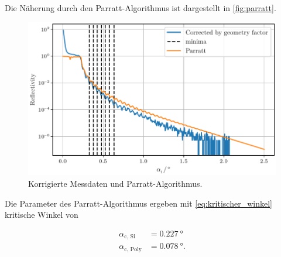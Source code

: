 Die Näherung durch den Parratt-Algorithmus ist dargestellt in \autoref{fig:parratt}.

\begin{figure}[H]
    \centering
    \includegraphics[width=\textwidth]{plots/parrat_comparison.pdf}
    \caption{Korrigierte Messdaten und Parratt-Algorithmus.}
    \label{fig:parratt}
\end{figure}

Die Parameter des Parratt-Algorithmus ergeben mit \autoref{eq:kritischer_winkel} kritische Winkel von

\begin{align*}
    \alpha_\text{c, Si} &= \qty{0.227}{\degree} \\
    \alpha_\text{c, Poly} &= \qty{0.078}{\degree}.
\end{align*}

